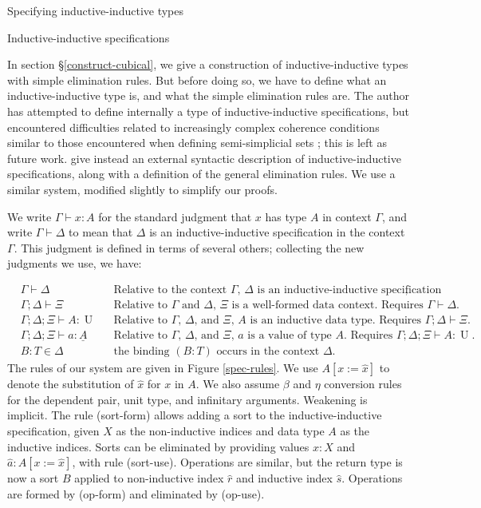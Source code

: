 \documentclass[acmsmall,review]{acmart}\settopmatter{printfolios=true,printccs=false,printacmref=false}
\DeclareMathOperator{\UU}{U}
\newcommand{\tac}{\vdash}
\begin{document}
\begin{section}{Specifying inductive-inductive types}
    
\begin{subsection}{Inductive-inductive specifications}\label{IIspecs-definition}

In section \S\ref{construct-cubical}, we give a construction of inductive-inductive types with simple elimination rules. But before doing so, we have to define what an inductive-inductive type is, and what the simple elimination rules are. The author has attempted to define internally a type of inductive-inductive specifications, but encountered difficulties related to increasingly complex coherence conditions similar to those encountered when defining semi-simplicial sets \citep{simplicialsets}; this is left as future work. \citet{KaposiKovacsHIITsyntax} give instead an external syntactic description of inductive-inductive specifications, along with a definition of the general elimination rules. We use a similar system, modified slightly to simplify our proofs.

We write $\Gamma \tac x : A$ for the standard judgment that $x$ has type $A$ in context $\Gamma$, and write $\Gamma \tac \Delta$ to mean that $\Delta$ is an inductive-inductive specification in the context $\Gamma$. This judgment is defined in terms of several others; collecting the new judgments we use, we have:

\begin{align*}
&\Gamma \tac \Delta && \text{Relative to the context $\Gamma$, $\Delta$ is an inductive-inductive specification},\\
&\Gamma ; \Delta \tac \Xi && \text{Relative to $\Gamma$ and $\Delta$, $\Xi$ is a well-formed data context. Requires $\Gamma \tac \Delta$.}\\
&\Gamma ; \Delta ; \Xi \tac A : \UU && \text{Relative to $\Gamma$, $\Delta$, and $\Xi$, $A$ is an inductive data type. Requires $\Gamma ; \Delta \tac \Xi$.}\\
&\Gamma ; \Delta ; \Xi \tac a : \underline{A} && \text{Relative to $\Gamma$, $\Delta$, and $\Xi$, $a$ is a value of type $A$. Requires $\Gamma ; \Delta ; \Xi \tac A : \UU$.}\\
&B : T \in \Delta && \text{the binding $(B : T)$ occurs in the context $\Delta$.}
\end{align*}
The rules of our system are given in Figure \ref{spec-rules}. We use $A[x := \hat{x}]$ to denote the substitution of $\hat{x}$ for $x$ in $A$. We also assume $\beta$ and $\eta$ conversion rules for the dependent pair, unit type, and infinitary arguments. Weakening is implicit. The rule (sort-form) allows adding a sort to the inductive-inductive specification, given $X$ as the non-inductive indices and data type $A$ as the inductive indices. Sorts can be eliminated by providing values $\hat{x} : X$ and $\hat{a} : A[x := \hat{x}]$, with rule (sort-use). Operations are similar, but the return type is now a sort $B$ applied to non-inductive index $\hat{r}$ and inductive index $\hat{s}$. Operations are formed by (op-form) and eliminated by (op-use).


\end{subsection}
\end{section}
\end{document}
